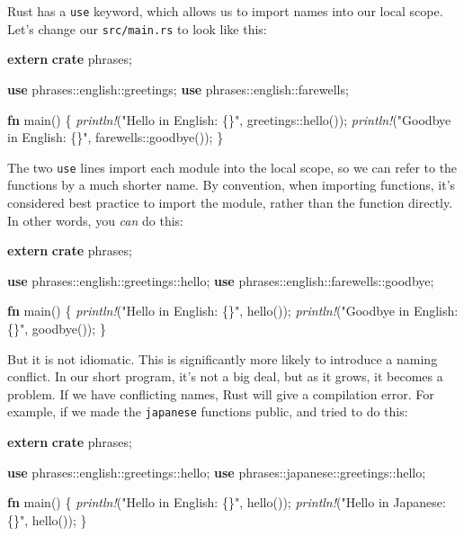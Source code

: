 \documentclass[a4paper,]{book}
\newenvironment{Shaded}{\begin{snugshade}}{\end{snugshade}}
\newcommand{\KeywordTok}[1]{\textcolor[rgb]{0.13,0.29,0.53}{\textbf{{#1}}}}
\newcommand{\StringTok}[1]{\textcolor[rgb]{0.31,0.60,0.02}{{#1}}}
\newcommand{\PreprocessorTok}[1]{\textcolor[rgb]{0.56,0.35,0.01}{\textit{{#1}}}}
\newcommand{\NormalTok}[1]{{#1}}
\begin{document}
Rust has a \texttt{use} keyword, which allows us to import names into
our local scope. Let's change our \texttt{src/main.rs} to look like
this:

\begin{Shaded}
\begin{Highlighting}[]
\KeywordTok{extern} \KeywordTok{crate} \NormalTok{phrases;}

\KeywordTok{use} \NormalTok{phrases::english::greetings;}
\KeywordTok{use} \NormalTok{phrases::english::farewells;}

\KeywordTok{fn} \NormalTok{main() \{}
    \PreprocessorTok{println!}\NormalTok{(}\StringTok{"Hello in English: \{\}"}\NormalTok{, greetings::hello());}
    \PreprocessorTok{println!}\NormalTok{(}\StringTok{"Goodbye in English: \{\}"}\NormalTok{, farewells::goodbye());}
\NormalTok{\}}
\end{Highlighting}
\end{Shaded}

The two \texttt{use} lines import each module into the local scope, so
we can refer to the functions by a much shorter name. By convention,
when importing functions, it's considered best practice to import the
module, rather than the function directly. In other words, you
\emph{can} do this:

\begin{Shaded}
\begin{Highlighting}[]
\KeywordTok{extern} \KeywordTok{crate} \NormalTok{phrases;}

\KeywordTok{use} \NormalTok{phrases::english::greetings::hello;}
\KeywordTok{use} \NormalTok{phrases::english::farewells::goodbye;}

\KeywordTok{fn} \NormalTok{main() \{}
    \PreprocessorTok{println!}\NormalTok{(}\StringTok{"Hello in English: \{\}"}\NormalTok{, hello());}
    \PreprocessorTok{println!}\NormalTok{(}\StringTok{"Goodbye in English: \{\}"}\NormalTok{, goodbye());}
\NormalTok{\}}
\end{Highlighting}
\end{Shaded}

But it is not idiomatic. This is significantly more likely to introduce
a naming conflict. In our short program, it's not a big deal, but as it
grows, it becomes a problem. If we have conflicting names, Rust will
give a compilation error. For example, if we made the \texttt{japanese}
functions public, and tried to do this:

\begin{Shaded}
\begin{Highlighting}[]
\KeywordTok{extern} \KeywordTok{crate} \NormalTok{phrases;}

\KeywordTok{use} \NormalTok{phrases::english::greetings::hello;}
\KeywordTok{use} \NormalTok{phrases::japanese::greetings::hello;}

\KeywordTok{fn} \NormalTok{main() \{}
    \PreprocessorTok{println!}\NormalTok{(}\StringTok{"Hello in English: \{\}"}\NormalTok{, hello());}
    \PreprocessorTok{println!}\NormalTok{(}\StringTok{"Hello in Japanese: \{\}"}\NormalTok{, hello());}
\NormalTok{\}}
\end{Highlighting}
\end{Shaded}
\end{document}
